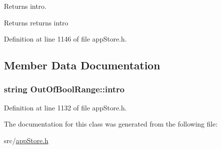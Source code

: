 Returns intro. 

\begin{DoxyReturn}{Returns}
returns intro 
\end{DoxyReturn}


Definition at line 1146 of file app\-Store.\-h.



\subsection{Member Data Documentation}
\hypertarget{class_out_of_bool_range_a1acf2deb240e2343b8cb317f07ac0f27}{
\subsubsection[{intro}]{\setlength{\rightskip}{0pt plus 5cm}string Out\-Of\-Bool\-Range\-::intro}}\label{class_out_of_bool_range_a1acf2deb240e2343b8cb317f07ac0f27}


Definition at line 1132 of file app\-Store.\-h.



The documentation for this class was generated from the following file\-:\begin{DoxyCompactItemize}
\item 
src/\hyperlink{app_store_8h}{app\-Store.\-h}\end{DoxyCompactItemize}
